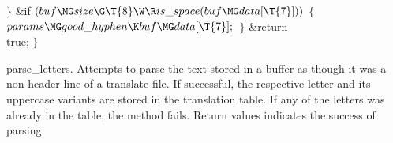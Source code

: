 \4${}\}{}$\2\6
\&{if} ${}(\\{buf}\MG\\{size}\G\T{8}\W\R\\{is\_space}(\\{buf}\MG\\{data}[%
\T{7}])){}$\5
${}\{{}$\1\6
${}\\{params}\MG\\{good\_hyphen}\K\\{buf}\MG\\{data}[\T{7}];{}$\6
\4${}\}{}$\2\6
\&{return} \\{true};\6
\4${}\}{}$\2\par
\fi

parse\_letters.
Attempts to parse the text stored in a buffer as though it was a non-header
line of a translate file. If successful,
the respective letter and its uppercase variants are stored in the translation
table. If any of the letters was already
in the table, the method fails. Return values indicates the success of parsing.

